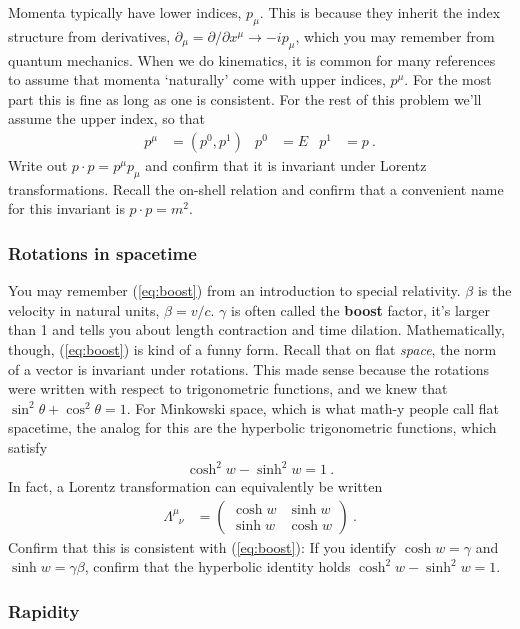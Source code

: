 \documentclass[12pt]{article}
\begin{document}
Momenta typically have lower indices, $p_\mu$. This is because they inherit the index structure from derivatives, $\partial_\mu = \partial/\partial x^\mu \to -i p_\mu $, which you may remember from quantum mechanics. When we do kinematics, it is common for many references to assume that momenta `naturally' come with upper indices, $p^\mu$. For the most part this is fine as long as one is consistent. For the rest of this problem we'll assume the upper index, so that
\begin{align}
	p^\mu &= (p^0, p^1) 
	&
	p^0 &= E 
	&
	p^1 &= p \ .
\end{align}
Write out $p\cdot p = p^\mu p_\mu$ and confirm that it is invariant under Lorentz transformations. Recall the on-shell relation and confirm that a convenient name for this invariant is $p\cdot p = m^2$.

\subsubsection{Rotations in spacetime}

You may remember (\ref{eq:boost}) from an introduction to special relativity. $\beta$ is the velocity in natural units, $\beta = v/c$. $\gamma$ is often called the \textbf{boost} factor, it's larger than 1 and tells you about length contraction and time dilation. Mathematically, though, (\ref{eq:boost}) is kind of a funny form. Recall that on flat \emph{space}, the norm of a vector is invariant under rotations. This made sense because the rotations were written with respect to trigonometric functions, and we knew that $\sin^2\theta + \cos^2\theta = 1$. For Minkowski space, which is what math-y people call flat spacetime, the analog for this are the hyperbolic trigonometric functions, which satisfy
\begin{align}
	\cosh^2 w - \sinh^2 w = 1 \ . 
\end{align}
In fact, a Lorentz transformation can equivalently be written
\begin{align}
		\Lambda^\mu_{\phantom \mu \nu} &= 
	\begin{pmatrix}
		\cosh w & \sinh w
		\\
		\sinh w & \cosh w
	\end{pmatrix}
\ .
\end{align}
Confirm that this is consistent with (\ref{eq:boost}): If you identify $\cosh w = \gamma$ and $\sinh w = \gamma\beta$, confirm that the hyperbolic identity holds $\cosh^2 w - \sinh^2 w = 1$.

\subsubsection{Rapidity}
\end{document}
